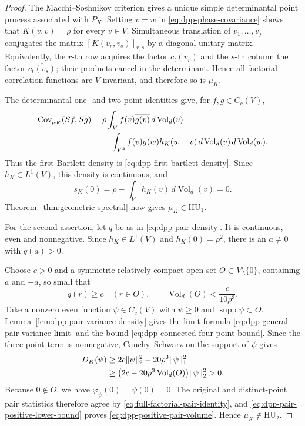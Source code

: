 \documentclass[11pt,reqno,a4paper]{amsart}
\numberwithin{equation}{section}
\theoremstyle{compact}
\theoremstyle{definition}
\theoremstyle{definition}
\newcommand{\HU}{\mathrm{HU}}
\newcommand{\Cov}{\operatorname{Cov}}
\newcommand{\Vol}{\operatorname{Vol}}
\begin{document}
\begin{proof}
The Macchi--Soshnikov criterion \cite[Theorem~3]{Sos00} gives a unique simple determinantal point process associated with $P_K$.  Setting $v=w$ in \eqref{eq:dpp-phase-covariance} shows that
$K(v,v)=\rho$ for every $v\in V$.  Simultaneous translation of
$v_1,\ldots,v_j$ conjugates the matrix $[K(v_r,v_s)]_{r,s}$ by a diagonal
unitary matrix.  Equivalently, the $r$-th row acquires the factor
$c_t(v_r)$ and the $s$-th column the factor $\overline{c_t(v_s)}$; their
products cancel in the determinant.  Hence all factorial correlation
functions are $V$-invariant, and therefore so is $\mu_K$.

The determinantal one- and two-point identities give, for $f,g\in C_c(V)$,
\begin{align}\label{eq:dpp-first-covariance}
  \Cov_{\mu_K}(Sf,Sg)
  ={}&\rho\int_V f(v)\overline{g(v)}\,d\Vol_d(v)\notag\\
     &-\int_{V^2}f(v)\overline{g(w)}h_K(w-v)\,
       d\Vol_d(v)\,d\Vol_d(w).
\end{align}
Thus the first Bartlett density is \eqref{eq:dpp-first-bartlett-density}.
Since $h_K\in L^1(V)$, this density is continuous, and
\begin{equation}\label{eq:dpp-zero-frequency}
  s_K(0)=\rho-\int_V h_K(v)\,d\Vol_d(v)=0.
\end{equation}
Theorem~\ref{thm:geometric-spectral} now gives $\mu_K\in\HU_1$.

For the second assertion, let $q$ be as in
\eqref{eq:dpp-pair-density}.  It is continuous, even and nonnegative.  Since $h_K\in L^1(V)$ and $h_K(0)=\rho^2$, there is an
$a\neq0$ with $q(a)>0$.

Choose $c>0$ and a symmetric relatively compact open set
$O\subset V\setminus\{0\}$, containing $a$ and $-a$, so small that
\begin{equation}\label{eq:dpp-small-pair-support}
  q(r)\geq c\quad(r\in O),
  \qquad
  \Vol_d(O)<\frac{c}{10\rho^3}.
\end{equation}
Take a nonzero even function $\psi\in C_c(V)$ with $\psi\geq0$ and
$\operatorname{supp}\psi\subset O$.  Lemma~\ref{lem:dpp-pair-variance-density} gives the limit formula
\eqref{eq:dpp-general-pair-variance-limit} and the bound
\eqref{eq:dpp-connected-four-point-bound}.  Since the three-point term is
nonnegative, Cauchy--Schwarz on the support of $\psi$ gives
\begin{align}\label{eq:dpp-pair-positive-lower-bound}
  D_K(\psi)
  &\geq2c\|\psi\|_2^2-20\rho^3\|\psi\|_1^2\notag\\
  &\geq\big(2c-20\rho^3\Vol_d(O)\big)\|\psi\|_2^2>0.
\end{align}
Because $0\notin O$, we have $\varphi_\psi(0)=\psi(0)=0$.  The original and distinct-point
pair statistics therefore agree by \eqref{eq:full-factorial-pair-identity},
and \eqref{eq:dpp-pair-positive-lower-bound} proves
\eqref{eq:dpp-positive-pair-volume}.  Hence $\mu_K\notin\HU_2$.
\end{proof}
\end{document}
